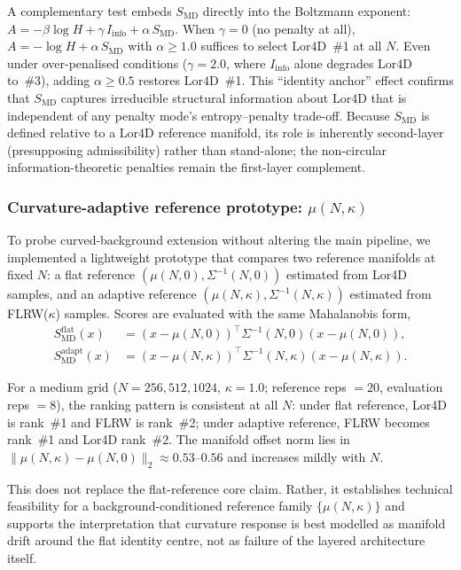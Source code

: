 \documentclass[12pt,a4paper]{article}
\newcommand{\SMD}{S_{\mathrm{MD}}}
\newcommand{\Lor}{\mathrm{Lor4D}}
\begin{document}
A complementary test embeds $\SMD$ directly into the Boltzmann exponent:
$A = -\beta\log H + \gamma\,I_{\mathrm{info}} + \alpha\,\SMD$.
When $\gamma=0$ (no penalty at all), $A=-\log H + \alpha\,\SMD$ with
$\alpha\geq 1.0$ suffices to select $\Lor$~\#1 at all $N$.
Even under over-penalised conditions ($\gamma=2.0$, where $I_{\mathrm{info}}$
alone degrades $\Lor$ to~\#3), adding $\alpha\geq 0.5$ restores $\Lor$~\#1.
This ``identity anchor'' effect confirms that $\SMD$ captures irreducible
structural information about $\Lor$ that is independent of any penalty
mode's entropy--penalty trade-off.
Because $\SMD$ is defined relative to a $\Lor$ reference manifold, its role is
inherently second-layer (presupposing admissibility) rather than stand-alone;
the non-circular information-theoretic penalties remain the first-layer
complement.

\subsubsection{Curvature-adaptive reference prototype: \texorpdfstring{$\mu(N,\kappa)$}{mu(N,kappa)}}
\label{sec:mu-kappa-prototype}

To probe curved-background extension without altering the main pipeline,
we implemented a lightweight prototype that compares two reference manifolds
at fixed $N$: a flat reference $(\mu(N,0),\Sigma^{-1}(N,0))$ estimated from
Lor4D samples, and an adaptive reference $(\mu(N,\kappa),\Sigma^{-1}(N,\kappa))$
estimated from FLRW($\kappa$) samples.
Scores are evaluated with the same Mahalanobis form,
\begin{align}
S_{\mathrm{MD}}^{\mathrm{flat}}(x)
&=(x-\mu(N,0))^\top\Sigma^{-1}(N,0)(x-\mu(N,0)),\\
S_{\mathrm{MD}}^{\mathrm{adapt}}(x)
&=(x-\mu(N,\kappa))^\top\Sigma^{-1}(N,\kappa)(x-\mu(N,\kappa)).
\end{align}

For a medium grid ($N=256,512,1024$, $\kappa=1.0$; reference reps $=20$,
evaluation reps $=8$), the ranking pattern is consistent at all $N$:
under flat reference, Lor4D is rank~\#1 and FLRW is rank~\#2; under adaptive
reference, FLRW becomes rank~\#1 and Lor4D rank~\#2.
The manifold offset norm lies in
$\|\mu(N,\kappa)-\mu(N,0)\|_2\approx0.53\text{--}0.56$ and
increases mildly with $N$.

This does not replace the flat-reference core claim.
Rather, it establishes technical feasibility for a background-conditioned
reference family $\{\mu(N,\kappa)\}$ and supports the interpretation that
curvature response is best modelled as manifold drift around the flat identity
centre, not as failure of the layered architecture itself.
\end{document}
